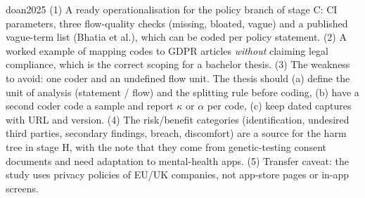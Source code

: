 \begin{papercard}{doan2025}
 (1) A ready operationalisation for the policy branch of stage C: CI parameters, three flow-quality checks (missing, bloated, vague) and a published vague-term list (Bhatia et al.), which can be coded per policy statement. (2) A worked example of mapping codes to GDPR articles \emph{without} claiming legal compliance, which is the correct scoping for a bachelor thesis. (3) The weakness to avoid: one coder and an undefined flow unit. The thesis should (a) define the unit of analysis (statement / flow) and the splitting rule before coding, (b) have a second coder code a sample and report $\kappa$ or $\alpha$ per code, (c) keep dated captures with URL and version. (4) The risk/benefit categories (identification, undesired third parties, secondary findings, breach, discomfort) are a source for the harm tree in stage H, with the note that they come from genetic-testing consent documents and need adaptation to mental-health apps. (5) Transfer caveat: the study uses privacy policies of EU/UK companies, not app-store pages or in-app screens.
\end{papercard}
